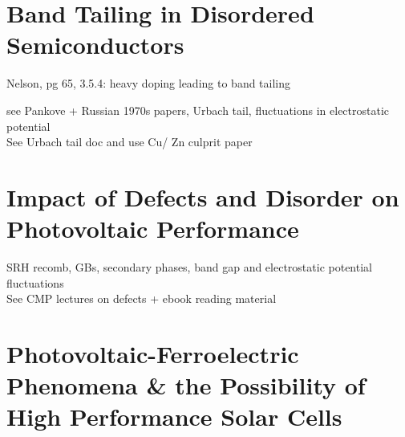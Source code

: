 \section{Band Tailing in Disordered Semiconductors}
Nelson, pg 65, 3.5.4: heavy doping leading to band tailing

see Pankove + Russian 1970s papers, Urbach tail, fluctuations in electrostatic potential\\
See Urbach tail doc and use Cu/ Zn culprit paper

\section{Impact of Defects and Disorder on Photovoltaic Performance}\label{defects_in_PV}
SRH recomb, GBs, secondary phases, band gap and electrostatic potential fluctuations\\
See CMP lectures on defects + ebook reading material 

\section{Photovoltaic-Ferroelectric Phenomena \& the Possibility of High Performance Solar Cells}